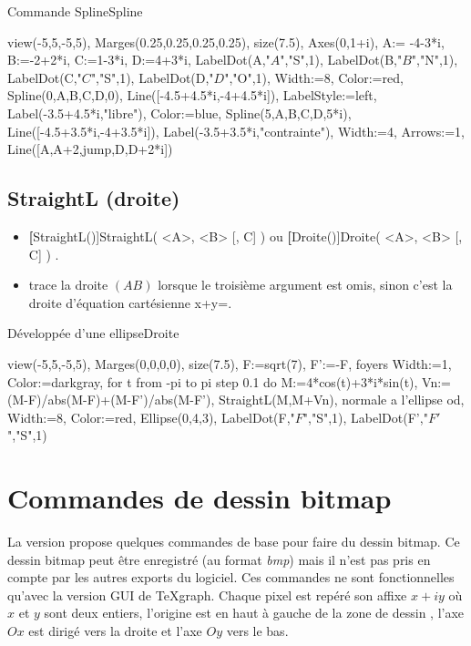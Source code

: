 \begin{demo}{Commande Spline}{Spline}
\begin{texgraph}[name=Spline]
view(-5,5,-5,5), Marges(0.25,0.25,0.25,0.25), size(7.5),
Axes(0,1+i),
A:= -4-3*i, B:=-2+2*i, C:=1-3*i, D:=4+3*i,
LabelDot(A,"$A$","S",1), LabelDot(B,"$B$","N",1),
LabelDot(C,"$C$","S",1), LabelDot(D,"$D$","O",1),
Width:=8, Color:=red, Spline(0,A,B,C,D,0),
Line([-4.5+4.5*i,-4+4.5*i]), LabelStyle:=left,
Label(-3.5+4.5*i,"libre"), Color:=blue, Spline(5,A,B,C,D,5*i),
Line([-4.5+3.5*i,-4+3.5*i]), Label(-3.5+3.5*i,"contrainte"),
Width:=4, Arrows:=1, Line([A,A+2,jump,D,D+2*i])
\end{texgraph}
\end{demo}

\subsection{StraightL (droite)}\label{cmdDroite}
\begin{itemize}
 \item \util \textbf[StraightL()]{StraightL( <A>, <B> [, C] )} ou \textbf[Droite()]{Droite( <A>, <B> [, C] )} .
 \item \desc trace la droite $(AB)$ lorsque le troisième argument  est omis, sinon c'est la droite d'équation cartésienne x+y=.
\end{itemize}

\begin{demo}{Développée d'une ellipse}{Droite}
\begin{texgraph}[name=Droite]
view(-5,5,-5,5), Marges(0,0,0,0), size(7.5),
F:=sqrt(7), F':=-F, {foyers} Width:=1, Color:=darkgray,
for t from -pi to pi step 0.1 do
 M:=4*cos(t)+3*i*sin(t),
 Vn:=(M-F)/abs(M-F)+(M-F')/abs(M-F'),
 StraightL(M,M+Vn), {normale a l'ellipse}
od,
Width:=8, Color:=red, Ellipse(0,4,3),
LabelDot(F,"$F$","S",1), LabelDot(F',"$F'$","S",1)
\end{texgraph}
\end{demo}


\section{Commandes de dessin bitmap}

La version \version propose quelques commandes de base pour faire du dessin bitmap. Ce dessin bitmap peut être enregistré (au format \textit{bmp}) mais il n'est pas pris en compte par les autres exports du logiciel. Ces commandes ne sont fonctionnelles qu'avec la version GUI de TeXgraph. Chaque pixel est repéré son affixe $x+iy$ où $x$ et $y$ sont deux entiers, l'origine est en haut à gauche de la zone de dessin , l'axe $Ox$ est dirigé vers la droite et l'axe $Oy$ vers le bas.

